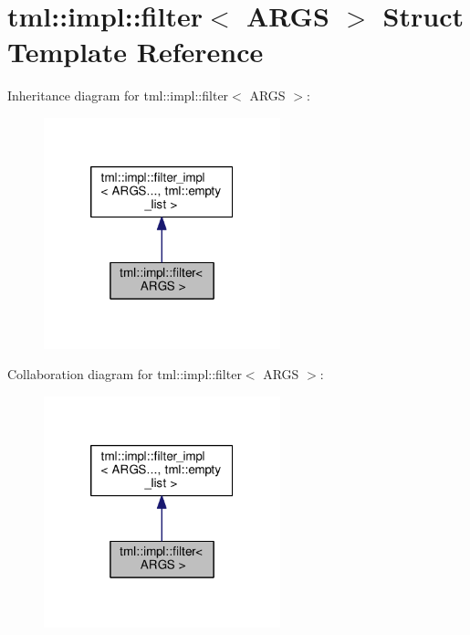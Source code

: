 \hypertarget{structtml_1_1impl_1_1filter}{\section{tml\+:\+:impl\+:\+:filter$<$ A\+R\+G\+S $>$ Struct Template Reference}
\label{structtml_1_1impl_1_1filter}
}


Inheritance diagram for tml\+:\+:impl\+:\+:filter$<$ A\+R\+G\+S $>$\+:
\nopagebreak
\begin{figure}[H]
\begin{center}
\leavevmode
\includegraphics[width=194pt]{structtml_1_1impl_1_1filter__inherit__graph}
\end{center}
\end{figure}


Collaboration diagram for tml\+:\+:impl\+:\+:filter$<$ A\+R\+G\+S $>$\+:
\nopagebreak
\begin{figure}[H]
\begin{center}
\leavevmode
\includegraphics[width=194pt]{structtml_1_1impl_1_1filter__coll__graph}
\end{center}
\end{figure}


